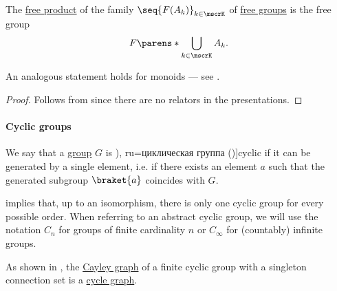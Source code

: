 \begin{corollary}\label{thm:free_product_of_free_groups}
  The \hyperref[def:monoid_free_product]{free product} of the family \( \seq{ F(A_k) }_{k \in \mscrK} \) of \hyperref[def:free_group]{free groups} is the free group
  \begin{equation*}
    F\parens*{ \bigcup_{k \in \mscrK} A_k }.
  \end{equation*}
\end{corollary}
\begin{comments}
  \item An analogous statement holds for monoids --- see .
\end{comments}
\begin{proof}
  Follows from  since there are no relators in the presentations.
\end{proof}

\paragraph{Cyclic groups}

\begin{definition}\label{def:cyclic_group}
  We say that a \hyperref[def:group]{group} \( G \) is \term[ru=циклична группа (\cite[379]{Обрешков1962ВисшаАлгебра}), ru=циклическая группа (\cite[97]{Тыртышников2017ОсновыАлгебры})]{cyclic} if it can be generated by a single element, i.e. if there exists an element \( a \) such that the generated subgroup \( \braket{ a } \) coincides with \( G \).

   implies that, up to an isomorphism, there is only one cyclic group for every possible order. When referring to an abstract cyclic group, we will use the notation \( C_n \) for groups of finite cardinality \( n \) or \( C_\infty \) for (countably) infinite groups.
\end{definition}
\begin{comments}
  \item As shown in , the \hyperref[def:cayley_graph]{Cayley graph} of a finite cyclic group with a singleton connection set is a \hyperref[def:cycle_graph]{cycle graph}.
\end{comments}

